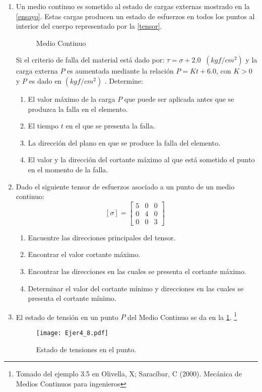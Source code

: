 \documentclass[../notas medios.tex]{subfiles}
\begin{document}
\begin{enumerate}
\item \label{punto23} Un medio continuo es sometido al estado de cargas externas  mostrado en la \cref{ensayo}. Estas cargas producen un estado de esfuerzos en todos los puntos  al interior del cuerpo  representado  por la \cref{tensor}. 
\begin{figure}[H]
	\centering
		\hspace{2.0cm}
	\caption{ Medio Continuo}
\end{figure}

Si el criterio de falla del material está dado por: $\tau = \sigma + 2.0 \;\; (kgf/cm^2)$ y  la carga externa $P$ es aumentada mediante la relación $P = Kt + 6.0$, con $K > 0$ y $P$ es dado en $ (kgf/cm^2)$   . Determine: 

\begin{enumerate}
\item El valor máximo de la carga  $P$ que puede ser aplicada antes que se produzca la  falla en el elemento.
\item El tiempo $t$ en el que se presenta la falla.
\item La  dirección del plano en que se produce la falla del elemento.  
\item El valor y la dirección del cortante máximo al que está sometido el punto en el momento de la falla. 
\end{enumerate}

\item \label{punto24} Dado el siguiente tensor de esfuerzos asociado a un punto
de un medio continuo:
\[ [\sigma] = \left[ \begin{array}{ccc}
	5 & 0 & 0 \\ 
	0 & 4 & 0 \\ 
	0 & 0 & 3
	\end{array}  \right] \enspace \]
	\begin{enumerate}
		\item Encuentre las direcciones principales del tensor.
		\item Encontrar el valor cortante máximo.
		\item Encontrar las direcciones en las cuales se presenta el cortante máximo.
		\item Determinar el valor del cortante mínimo y direcciones en las cuales se presenta el cortante mínimo.
	\end{enumerate}
 \item \label{punto25} El estado de tensión en un punto $P$ del Medio Continuo
se da en la \cref{cubo}. \footnote{Tomado del ejemplo 3.5 en Olivella, X; Saracíbar, C (2000). Mecánica de Medios Continuos para ingenieros}\\
%
\begin{figure}[H]
	\centering
	\texttt{[image: Ejer4\_8.pdf]}
	\caption{Estado de tensiones en el punto.}
	\label{cubo}
\end{figure}


\end{enumerate}
\end{document}

